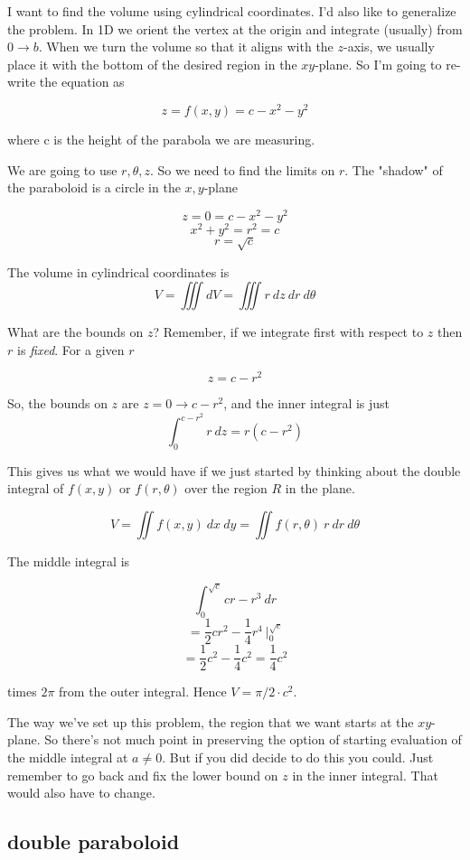 \documentclass[11pt, oneside]{report}   	%
\begin{document}
I want to find the volume using cylindrical coordinates.  I'd also like to generalize the problem.  In 1D we orient the vertex at the origin and integrate (usually) from $0 \rightarrow b$.  When we turn the volume so that it aligns with the $z$-axis, we usually place it with the bottom of the desired region in the $xy$-plane.  So I'm going to re-write the equation as

\[ z = f(x,y) = c - x^2 - y^2 \]

where c is the height of the parabola we are measuring.  

We are going to use $r, \theta, z$.  So we need to find the limits on $r$.  The "shadow" of the paraboloid is a circle in the $x,y$-plane 

\[ z = 0 = c - x^2 - y^2 \]
\[ x^2 + y^2 = r^2 = c \]
\[ r = \sqrt{c} \]

The volume in cylindrical coordinates is
\[ V = \iiint dV = \iiint r \ dz \ dr \ d \theta \]

What are the bounds on $z$?  Remember, if we integrate first with respect to $z$ then $r$ is \emph{fixed}.  For a given $r$

\[ z =  c - r^2  \]

So, the bounds on $z$ are $z=0 \rightarrow c - r^2$, and the inner integral is just
\[ \int_0^{c-r^2} r \ dz = r( c-r^2) \]

This gives us what we would have if we just started by thinking about the double integral of $f(x,y)$ or $f(r,\theta)$ over the region $R$ in the plane.

\[ V = \iint f(x,y) \ dx \ dy = \iint f(r,\theta) \ r \ dr \ d \theta \]

The middle integral is

\[ \int_0^{\sqrt{c}} cr - r^3 \ dr \]
\[ = \frac{1}{2}cr^2 - \frac{1}{4}r^4 \ \bigg |_0^{\sqrt{c}} \]
\[ = \frac{1}{2}c^2 - \frac{1}{4}c^2 =  \frac{1}{4}c^2 \]

times $2 \pi$ from the outer integral.  Hence $V= \pi/2 \cdot c^2$.

The way we've set up this problem, the region that we want starts at the $xy$-plane.  So there's not much point in preserving the option of starting evaluation of the middle integral at $a \ne 0$.  But if you did decide to do this you could.  Just remember to go back and fix the lower bound on $z$ in the inner integral.  That would also have to change.

\subsection*{double paraboloid}
\end{document}
